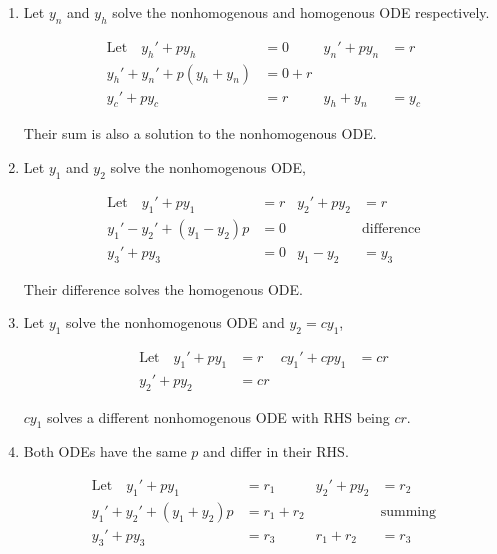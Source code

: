\begin{enumerate}
    \item Let $ y_{n} $ and $ y_{h} $ solve the nonhomogenous and homogenous ODE
          respectively.

          \begin{align}
              \text{Let} \quad y_{h}' + py_{h}   & = 0     &
              y_{n}' + py_{n}                    & = r       \\
              y_{h}' + y_{n}' + p(y_{h} + y_{n}) & = 0 + r   \\
              y_{c}' + py_{c}                    & = r     &
              y_{h} + y_{n}                      & = y_{c}
          \end{align}

          Their sum is also a solution to the nonhomogenous ODE.

    \item Let $ y_{1} $ and $ y_{2} $ solve the nonhomogenous ODE,

          \begin{align}
              \text{Let} \quad y_{1}' + py_{1}   & = r               &
              y_{2}' + py_{2}                    & = r                 \\
              y_{1}' - y_{2}' + (y_{1} - y_{2})p & = 0               &
                                                 & \text{difference}   \\
              y_{3}' + py_{3}                    & = 0               &
              y_{1} - y_{2}                      & = y_{3}
          \end{align}

          Their difference solves the homogenous ODE.

    \item Let $ y_{1} $ solve the nonhomogenous ODE and $ y_{2} = cy_{1} $,

          \begin{align}
              \text{Let} \quad y_{1}' + py_{1} & = r  &
              cy_{1}' + cpy_{1}                & = cr   \\
              y_{2}' + py_{2}                  & = cr
          \end{align}

          $ cy_{1} $ solves a different nonhomogenous ODE with RHS being $ cr $.

    \item Both ODEs have the same $ p $ and differ in their RHS.

          \begin{align}
              \text{Let} \quad y_{1}' + py_{1}   & = r_{1}         &
              y_{2}' + py_{2}                    & = r_{2}           \\
              y_{1}' + y_{2}' + (y_{1} + y_{2})p & = r_{1} + r_{2} &
                                                 & \text{summing}    \\
              y_{3}' + py_{3}                    & = r_{3}         &
              r_{1} + r_{2}                      & = r_{3}
          \end{align}


\end{enumerate}
